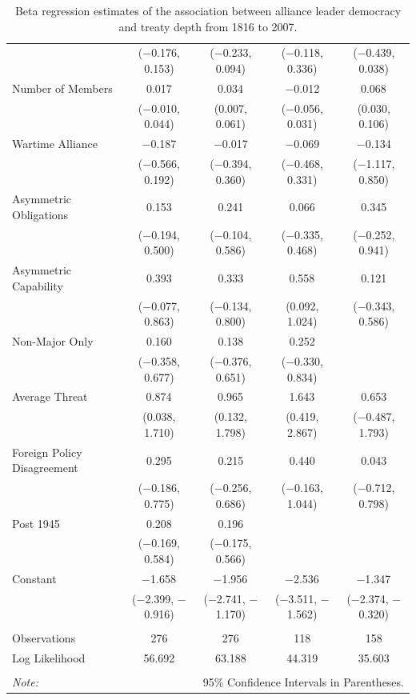 \documentclass[12pt]{article}
\begin{document}
\begin{table}[!htbp]
\begin{tabular}{@{\extracolsep{5pt}}lcccc}
  & ($-$0.176, 0.153) & ($-$0.233, 0.094) & ($-$0.118, 0.336) & ($-$0.439, 0.038) \\ 
  Number of Members & 0.017 & 0.034$^{}$ & $-$0.012 & 0.068$^{}$ \\ 
  & ($-$0.010, 0.044) & (0.007, 0.061) & ($-$0.056, 0.031) & (0.030, 0.106) \\ 
  Wartime Alliance & $-$0.187 & $-$0.017 & $-$0.069 & $-$0.134 \\ 
  & ($-$0.566, 0.192) & ($-$0.394, 0.360) & ($-$0.468, 0.331) & ($-$1.117, 0.850) \\ 
  Asymmetric Obligations & 0.153 & 0.241 & 0.066 & 0.345 \\ 
  & ($-$0.194, 0.500) & ($-$0.104, 0.586) & ($-$0.335, 0.468) & ($-$0.252, 0.941) \\ 
  Asymmetric Capability & 0.393 & 0.333 & 0.558$^{}$ & 0.121 \\ 
  & ($-$0.077, 0.863) & ($-$0.134, 0.800) & (0.092, 1.024) & ($-$0.343, 0.586) \\ 
  Non-Major Only & 0.160 & 0.138 & 0.252 &  \\ 
  & ($-$0.358, 0.677) & ($-$0.376, 0.651) & ($-$0.330, 0.834) &  \\ 
  Average Threat & 0.874$^{}$ & 0.965$^{}$ & 1.643$^{}$ & 0.653 \\ 
  & (0.038, 1.710) & (0.132, 1.798) & (0.419, 2.867) & ($-$0.487, 1.793) \\ 
  Foreign Policy Disagreement & 0.295 & 0.215 & 0.440 & 0.043 \\ 
  & ($-$0.186, 0.775) & ($-$0.256, 0.686) & ($-$0.163, 1.044) & ($-$0.712, 0.798) \\ 
  Post 1945 & 0.208 & 0.196 &  &  \\ 
  & ($-$0.169, 0.584) & ($-$0.175, 0.566) &  &  \\ 
  Constant & $-$1.658$^{}$ & $-$1.956$^{}$ & $-$2.536$^{}$ & $-$1.347$^{}$ \\ 
  & ($-$2.399, $-$0.916) & ($-$2.741, $-$1.170) & ($-$3.511, $-$1.562) & ($-$2.374, $-$0.320) \\ 
 \hline \\[-1.8ex] 
Observations & 276 & 276 & 118 & 158 \\ 
Log Likelihood & 56.692 & 63.188 & 44.319 & 35.603 \\ 
\hline 
\hline \\[-1.8ex] 
\textit{Note:}  & \multicolumn{4}{r}{95\% Confidence Intervals in Parentheses.} \\ 
\end{tabular} 
  \caption{Beta regression estimates of the association between alliance leader democracy and treaty depth from 1816 to 2007.} 
  \label{tab:reg-est} 
\end{table} 
\end{document}
